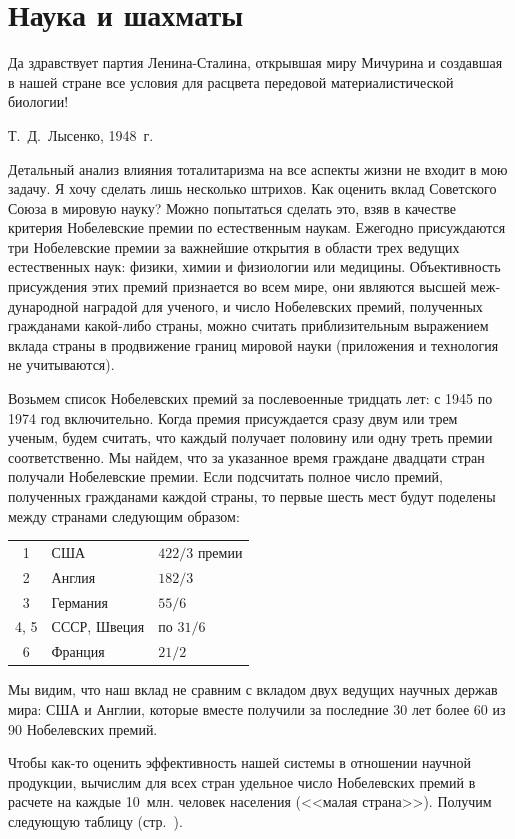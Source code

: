 \documentclass{book}
\begin{document}
\section{Наука и шахматы}

\epigraph{Да здравствует партия Ленина-Сталина, открывшая миру Мичурина и создавшая в нашей стране все условия для расцвета передовой материалистической биологии!}{Т.~Д.~Лысенко, 1948~г.}

Детальный анализ влияния тоталитаризма на все аспекты жиз­ни не входит в мою задачу. Я хочу сделать лишь несколько штрихов.
Как оценить вклад Советского Союза в мировую науку? Можно попытаться сделать это, взяв в качестве критерия Нобелевские премии по 
естественным наукам. Ежегодно при­суждаются три Нобелевские премии за важнейшие открытия в области трех ведущих естественных 
наук: физики, химии и физиологии или медицины. Объективность присуждения этих премий признается во всем мире, они являются 
высшей меж­дународной наградой для ученого, и число Нобелевских премий, полученных гражданами какой-либо страны, можно считать 
приблизительным выражением вклада страны в продвижение гра­ниц мировой науки (приложения и технология не учитываются).

Возьмем список Нобелевских премий за послевоенные тридцать лет: с 1945 по 1974 год включительно. Когда премия присуждается сразу 
двум или трем ученым, будем считать, что каждый получает половину или одну треть премии соответственно. Мы найдем, что за 
указанное время граждане двадцати стран получали Нобелевские премии. Если подсчитать полное число премий, полученных гражданами 
каждой страны, то первые шесть мест будут поделены между странами следующим образом:
\begin{center}
	\begin{tabular}{ c l l }
	\hline\hline
	1    & США 			& $42 2/3$ премии \\
	2    & Англия 		& $18 2/3$ \\
	3    & Германия 	& $5 5/6$ \\
	4, 5 & СССР, Швеция & по $3 1/6$ \\
	6    & Франция 		&  $2 1/2$ \\
	\hline\hline
	\end{tabular}
\end{center}
Мы видим, что наш вклад не сравним с вкладом двух ведущих научных держав мира: США и Англии, которые вместе получили за 
последние 30 лет более 60 из 90 Нобелевских премий.

Чтобы как-то оценить эффективность нашей системы в отно­шении научной продукции, вычислим для всех стран удельное число 
Нобелевских премий в расчете на каждые 10~млн. человек населения (<<малая страна>>). Получим следующую таблицу (стр.~\pageref{tab}).
\end{document}
